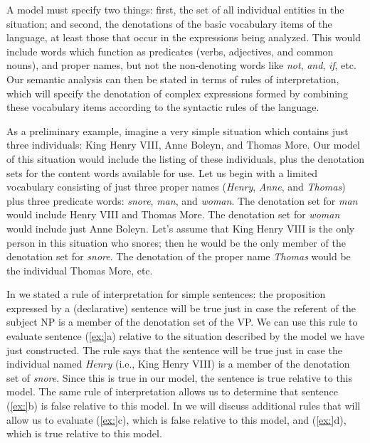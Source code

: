 A model must specify two things: first, the set of all individual entities in the situation; and second, the denotations of the basic vocabulary items of the language, at least those that occur in the expressions being analyzed. This would include words which function as predicates (verbs, adjectives, and common nouns), and proper names, but not the non-denoting words like \textit{not}, \textit{and}, \textit{if}, etc. Our semantic analysis can then be stated in terms of rules of interpretation, which will specify the denotation of complex expressions formed by combining these vocabulary items according to the syntactic rules of the language.



As a preliminary example, imagine a very simple situation which contains just three individuals: King Henry VIII, Anne Boleyn, and Thomas More. Our model of this situation would include the listing of these individuals, plus the denotation sets for the content words available for use. Let us begin with a limited vocabulary consisting of just three proper names (\textit{Henry}, \textit{Anne}, and \textit{Thomas}) plus three predicate words: \textit{snore}, \textit{man}, and \textit{woman}. The denotation set for \textit{man} would include Henry VIII and Thomas More. The denotation set for \textit{woman} would include just Anne Boleyn. Let’s assume that King Henry VIII is the only person in this situation who snores; then he would be the only member of the denotation set for \textit{snore}. The denotation of the proper name \textit{Thomas} would be the individual Thomas More, etc.



In  we stated a rule of interpretation for simple sentences: the proposition expressed by a (declarative) sentence will be true just in case the referent of the subject NP is a member of the denotation set of the VP. We can use this rule to evaluate sentence (\ref{ex:}a) relative to the situation described by the model we have just constructed. The rule says that the sentence will be true just in case the individual named \textit{Henry} (i.e., King Henry VIII) is a member of the denotation set of \textit{snore}. Since this is true in our model, the sentence is true relative to this model. The same rule of interpretation allows us to determine that sentence (\ref{ex:}b) is false relative to this model. In  we will discuss additional rules that will allow us to evaluate (\ref{ex:}c), which is false relative to this model, and (\ref{ex:}d), which is true relative to this model.


